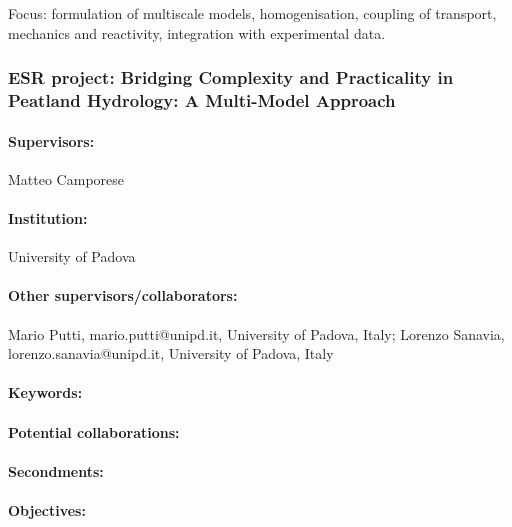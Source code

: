 \documentclass[12pt]{article}
\begin{document}
Focus: formulation of multiscale models, homogenisation, coupling of transport, mechanics and reactivity, integration with experimental data.

\subsubsection*{ESR project: Bridging Complexity and Practicality in Peatland Hydrology: A Multi-Model Approach}
\paragraph{Supervisors:} Matteo Camporese
\paragraph{Institution:} University of Padova
\paragraph{Other supervisors/collaborators:} Mario Putti, mario.putti@unipd.it, University of Padova, Italy; Lorenzo Sanavia, lorenzo.sanavia@unipd.it, University of Padova, Italy
\paragraph{Keywords:} 
\paragraph{Potential collaborations:} 
\paragraph{Secondments:} 
\paragraph{Objectives:} 
\end{document}
